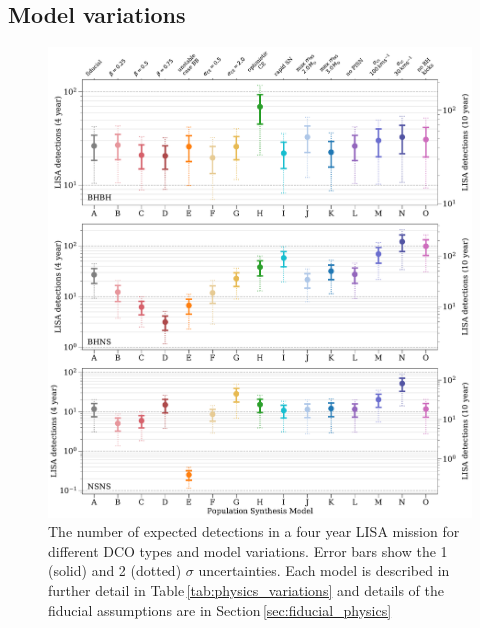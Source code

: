 \documentclass[twocolumn]{aastex63}
\begin{document}
\subsection{Model variations}

\begin{figure}[p]
    \centering
    \includegraphics[width=\textwidth]{dco_detections.pdf}
    \caption{The number of expected detections in a four year LISA mission for different DCO types and model variations. Error bars show the 1 (solid) and 2 (dotted) $\sigma$ uncertainties. Each model is described in further detail in Table\,\ref{tab:physics_variations} and details of the fiducial assumptions are in  Section\,\ref{sec:fiducial_physics}}
    \label{fig:model_variation_detections}
\end{figure}
\end{document}
